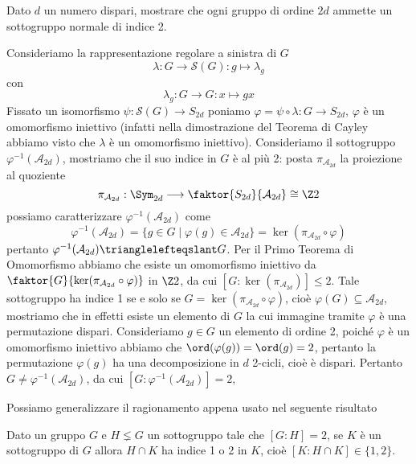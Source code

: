 \documentclass[11pt]{scrartcl}
\begin{document}
	\begin{exercise}
		\label{ex1.48}
		Dato $d$ un numero dispari, mostrare che ogni gruppo di ordine $2d$ ammette
		un sottogruppo normale di indice 2.
	\end{exercise}
	
	\begin{soln}
		Consideriamo la rappresentazione regolare a sinistra di $G$
		\[
		\lambda: G \longrightarrow \mathcal{S}(G) : g\longmapsto \lambda_g
		\]
		con
		\[
		\lambda_g : G\longrightarrow G : x\longmapsto gx
		\]
		Fissato un isomorfismo $\psi: \mathcal{S}(G) \longrightarrow S_{2d}$ poniamo
		$\varphi = \psi\circ\lambda :G\longrightarrow S_{2d}$, $\varphi$ è 
		un omomorfismo iniettivo (infatti nella dimostrazione del Teorema di Cayley
		abbiamo visto che $\lambda$ è un omomorfismo iniettivo). Consideriamo 
		il sottogruppo $\varphi^{-1}(\mathcal{A}_{2d})$, mostriamo che il suo 
		indice in $G$ è al più 2:
		posta $\pi_{\mathcal{A}_{2d}}$ la proiezione al quoziente
		\[
		\pi_{\mathcal{A}_{2d}}:\Sym_{2d}\longrightarrow \faktor{S_{2d}}{\mathcal{A}_{2d}}\cong \Z2
		\]
		possiamo caratterizzare $\varphi^{-1}(\mathcal{A}_{2d})$ come
		\[
		\varphi^{-1}(\mathcal{A}_{2d}) = \{g \in G \mid \varphi(g) \in \mathcal{A}_{2d}\}
		= \ker (\pi_{\mathcal{A}_{2d}}\circ\varphi)
		\]
		pertanto $\varphi^{-1}(\mathcal{A}_{2d})\trianglelefteqslant G$. 
		Per il Primo Teorema di Omomorfismo abbiamo che esiste un omomorfismo
		iniettivo da $\faktor{G}{\ker(\pi_{\mathcal{A}_{2d}}\circ\varphi)}$ in
		$\Z2$, da cui $[G:\ker(\pi_{\mathcal{A}_{2d}})] \leq 2$. Tale 
		sottogruppo ha indice 1 se e solo se $G = \ker(\pi_{\mathcal{A}_{2d}}\circ\varphi)$,
		cioè $\varphi(G) \subseteq \mathcal{A}_{2d}$, mostriamo che in effetti esiste 
		un elemento di $G$ la cui immagine tramite $\varphi$ è una permutazione 
		dispari. Consideriamo $g \in G$ un elemento di ordine 2, poiché $\varphi$
		è un omomorfismo iniettivo abbiamo che $\ord(\varphi(g)) = \ord(g) = 2$,
		pertanto la permutazione $\varphi(g)$ ha una decomposizione in $d$ 2-cicli,
		cioè è dispari. Pertanto $G \neq \varphi^{-1}(\mathcal{A}_{2d})$,
		da cui $[G: \varphi^{-1}(\mathcal{A}_{2d})] = 2$,
	\end{soln}
	
	Possiamo generalizzare il ragionamento appena usato nel seguente risultato
	
	\begin{proposition}
		\label{prop1.49}
		Dato un gruppo $G$ e $H\lneq G$ un sottogruppo tale che $[G:H] = 2$, se
		$K$ è un sottogruppo di $G$ allora $H\cap K$ ha indice 1 o 2 in $K$,
		cioè $[K:H\cap K] \in \{1, 2\}$.
	\end{proposition}
	
\end{document}
